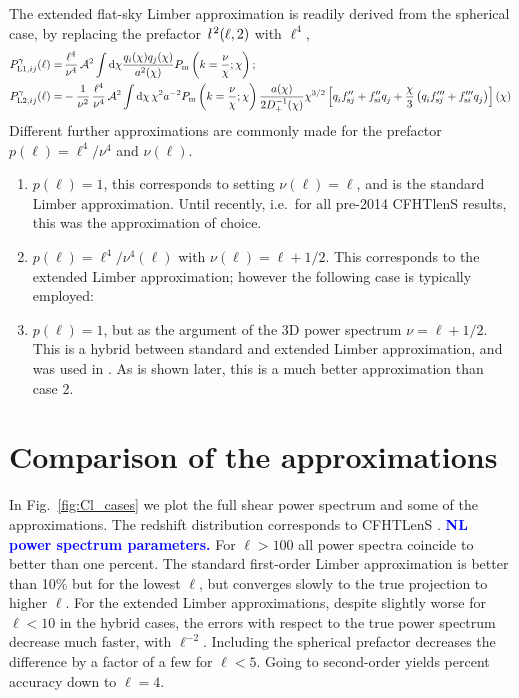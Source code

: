\documentclass[useAMS,usenatbib]{mn2e} %
\newcommand{\ellbar}{\hbox{\it \l}\,}
\newcommand{\pref}{{\cal A}}
\newcommand{\mk}[1]{{\bf\textcolor{blue}{#1}}}
\begin{document}
The extended flat-sky Limber approximation is readily derived from the
spherical case, by replacing the prefactor $\ellbar^2(\ell, 2)$ with $\ell^4$,
%
\begin{align}
  P^\gamma_{{\rm L1}, ij}(\ell) = & \, \frac{\ell^4}{\nu^4} \, \pref^2 \int {\rm d} \chi \frac{ q_i(\chi) q_j(\chi) }{a^2(\chi)}
  P_{\rm m}\left(k = \frac{\nu}{\chi}; \chi\right);
  \label{eq:P_ell_limber1}
  \\
    P^\gamma_{{\rm L2}, ij}(\ell) = & - \frac 1 {\nu^2} \, \frac{\ell^4}{\nu^4} \, \pref^2
    \int {\rm d} \chi \, \chi^{2} a^{-2} P_{\rm m}\left(k = \frac\nu\chi; \chi\right)
    \frac{a(\chi)}{2 D^{-1}_+(\chi)} \chi^{3/2} \left[ q^{}_i f^{\prime\prime}_{{\rm s}j} + f^{\prime\prime}_{{\rm s}i} q^{}_j  
      + \frac{\chi}{3} \left( q^{}_i f^{\prime\prime\prime}_{{\rm s}j} + f^{\prime\prime\prime}_{{\rm s}i} q^{}_j
      \right)
    \right](\chi)
  \label{eq:P_ell_limber2}
\end{align}
%
Different further approximations are commonly made for the prefactor $p(\ell) = \ell^4/\nu^4$ and $\nu(\ell)$.
%
\begin{enumerate}
  \item $p(\ell) = 1$, this corresponds to setting $\nu(\ell) = \ell$, and is the standard Limber approximation.
    Until recently, i.e.~for all pre-2014 CFHTlenS results, this was the approximation of choice.
  \item $p(\ell) = \ell^4/\nu^4(\ell)$ with $\nu(\ell) = \ell + 1/2$. This corresponds to the extended Limber
    approximation; however the following case is typically employed:
  \item $p(\ell) = 1$, but as the argument of the 3D power spectrum $\nu = \ell + 1/2$. This is a hybrid between
    standard and extended Limber approximation, and was used in \cite{KiDS-450,joudaki/etal:2016}. As is shown
    later, this is a much better approximation than case 2.
\end{enumerate}

\section{Comparison of the approximations}
\label{sec:comp}

In Fig.~\ref{fig:Cl_cases} we plot the full shear power spectrum and some of
the approximations. The redshift distribution corresponds to CFHTLenS
\cite{CFHTLenS-2pt-notomo}. \mk{NL power spectrum parameters.}
For $\ell > 100$ all power spectra coincide to
better than one percent. The standard first-order Limber approximation is
better than 10\% but for the lowest $\ell$, but converges slowly to the true
projection to higher $\ell$. For the extended Limber approximations, despite
slightly worse for $\ell < 10$ in the hybrid cases, the errors with respect to
the true power spectrum decrease much faster, with $\ell^{-2}$. Including the
spherical prefactor decreases the difference by a factor of a few for $\ell <
5$. Going to second-order yields percent accuracy down to $\ell = 4$.
\end{document}
